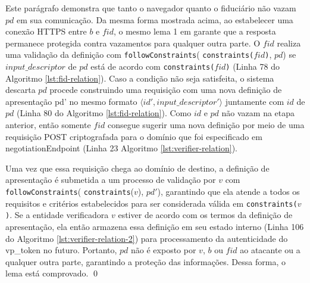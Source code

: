   Este parágrafo demonstra que tanto o navegador quanto o fiduciário não vazam $pd$ em sua comunicação. 
  Da mesma forma mostrada acima, ao estabelecer uma conexão HTTPS entre $b$ e $fid$, o mesmo lema 1 em \cite{fett2024wim} garante que a resposta permanece protegida contra vazamentos para qualquer outra parte.
  O $fid$ realiza uma validação da definição com \texttt{followConstraints}( \texttt{constraints($fid$)}, $pd$) se $input\_descriptor$ de $pd$ está de acordo com \texttt{constraints($fid$)} (Linha 78 do Algoritmo \ref{lst:fid-relation}).
  Caso a condição não seja satisfeita, o sistema descarta $pd$ procede construindo uma requisição com uma nova definição de apresentação pd' no mesmo formato $ \langle id', input\_descriptor'\rangle $ juntamente com $id$ de $pd$ (Linha 80 do Algoritmo \ref{lst:fid-relation}).
  Como $id$ e $pd$ não vazam na etapa anterior, então somente $fid$ consegue sugerir uma nova definição por meio de uma requisição POST criptografada para o domínio que foi especificado em negotiationEndpoint (Linha 23  Algoritmo \ref{lst:verifier-relation}).
  
  Uma vez que essa requisição chega ao domínio de destino, a definição de apresentação é submetida a um processo de validação por $v$ com \texttt{followConstraints}( \texttt{constraints}($v$), $pd'$), garantindo que ela atende a todos os requisitos e critérios estabelecidos para ser considerada válida em \texttt{constraints($v$)}. 
  Se a entidade verificadora $v$ estiver de acordo com os termos da definição de apresentação, ela então armazena essa definição em seu estado interno (Linha 106 do Algoritmo \ref{lst:verifier-relation-2}) para processamento da autenticidade do vp\_token no futuro.
  Portanto, $pd$ não é exposto por $v$, $b$ ou $fid$ ao atacante ou a qualquer outra parte, garantindo a proteção das informações. Dessa forma, o lema está comprovado. \qed

